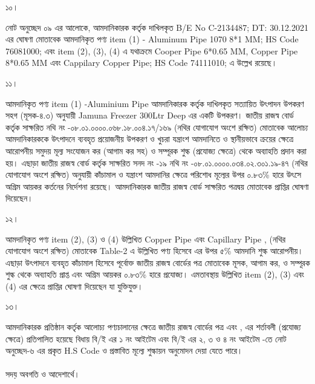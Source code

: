 \documentclass[12pt]{article}
\newcommand{\beno}{C-2134487}
\newcommand{\bedt}{30.12.2021}
\begin{document}
\thispagestyle{empty}
\vspace*{7.0in}
\noindent
\begin{minipage}[t]{0.05\linewidth}
১০।
\end{minipage}
\begin{minipage}[t]{0.95\linewidth}
নোট অনুচ্ছেদ ০৯ এর আলোকে,
আমদানিকারক {\jeal} কর্তৃক
দাখিলকৃত B/E No {\beno}; DT: {\bedt}
এর ঘোষণা মোতাবেক আমদানিকৃত পণ্য
item (1) - Aluminum Pipe 1070 8*1 MM; HS Code 76081000; {\cpcsso} এবং item
(2), (3), (4) এ যথাক্রমে Cooper Pipe 6*0.65 MM, Copper Pipe 8*0.65 MM এবং Cappilary Copper Pipe; HS Code 74111010; {\cpcfzn} এ উল্লেখ রয়েছে।
\\
\end{minipage}
\begin{minipage}[t]{0.05\linewidth}
১১।
\end{minipage}
\begin{minipage}[t]{0.95\linewidth}
আমদানিকৃত পণ্য item (1) -Aluminium Pipe আমদানিকারক কর্তৃক দাখিলকৃত সত্যায়িত উৎপাদন
উপকরণ সহগ (মূসক-৪.৩) অনুযায়ী
Jamuna Freezer 300Ltr Deep এর একটি উপকরণ। জাতীয় রাজস্ব বোর্ড কর্তৃক সাক্ষরিত নথি নং -০৮.০১.০০০০.০৬৮.১৮.০০৪.১৭/১৬৯ (নথির যোগাযোগ অংশে রক্ষিত) মোতাবেক আলোচ্য আমদানিকারককে
উৎপাদনে ব্যবহৃত প্রয়োজনীয় উপকরণ ও খুচরা যন্ত্রাংশ আমদানিতে ও স্থানীয়ভাবে ক্রয়ের ক্ষেত্রে আরোপনীয় সমুদয় মূল্য সংযোজন কর (আগাম কর সহ) ও সম্পূরক শুল্ক (প্রযোজ্য ক্ষেত্রে) থেকে অব্যাহতি প্রদান করা হয়।
এছাড়া
জাতীয় রাজস্ব বোর্ড কর্তৃক সাক্ষরিত সনদ নং -১৯ নথি নং -০৮.০১.০০০০.০৩৪.০২.৩০১.১৯-৪৭ (নথির যোগাযোগ অংশে রক্ষিত)
অনুযায়ী কাঁচামাল ও যন্ত্রাংশ আমদানির ক্ষেত্রে পরিশোধ মূল্যের উপর ০.৮৩\% হারে উৎসে অগ্রিম আয়কর কর্তনের নির্দেশনা রয়েছে।
আমদানিকারক জাতীয় রাজস্ব বোর্ড সাক্ষরিত পত্রদ্বয় মোতাবেক {\cpcsso} প্রাপ্তির ঘোষণা দিয়েছেন।
\\
\end{minipage}
\begin{minipage}[t]{0.05\linewidth}
১২।
\end{minipage}
\begin{minipage}[t]{0.95\linewidth}
আমদানিকৃত পণ্য item (2), (3) ও (4) উল্লিখিত Copper Pipe এবং Capillary Pipe {\srooof}, {\srooofd} (নথির যোগাযোগ অংশে রক্ষিত) মোতাবেক Table-2 এ উল্লিখিত পণ্য হিসেবে এর উপর ৫\% আমদানি শুল্ক আরোপনীয়। এছাড়া উৎপাদনে ব্যবহৃত
কাঁচামাল হিসেবে পূর্বোক্ত জাতীয় রাজস্ব বোর্ডের পত্র মোতাবেক মূসক, আগাম কর, ও সম্পূরক শুল্ক থেকে অব্যাহতি প্রাপ্ত এবং অগ্রিম আয়কর ০.৮৩\% হারে প্রযোজ্য। এমতাবস্থায় উল্লিখিত item (2), (3) এবং (4) এর ক্ষেত্রে {\cpcfzn} প্রাপ্তির ঘোষণা দিয়েছেন যা যুক্তিযুক্ত।
\\
\end{minipage}
\begin{minipage}[t]{0.05\linewidth}
১৩।
\end{minipage}
\begin{minipage}[t]{0.95\linewidth}
আমদানিকারক প্রতিষ্ঠান কর্তৃক
আলোচ্য পণ্যচালানের ক্ষেত্রে
জাতীয় রাজস্ব বোর্ডের পত্র
এবং {\srooof}, {\srooofd}
এর শর্তাবলী (প্রযোজ্য ক্ষেত্রে) প্রতিপালিত হয়েছে
বিধায় 
বি/ই এর ১ নং আইটেম
{\cpcsso}
এবং
বি/ই এর ২, ৩ ও ৪ নং আইটেম
{\cpcfzn} -তে নোট অনুচ্ছেদ-৬ এর প্রকৃত H.S Code
ও প্রস্তাবিত মূল্যে শুল্কায়ন অনুমোদন দেয়া যেতে পারে।
\\
\\
সদয় অবগতি ও আদেশার্থে।
\end{minipage}
\end{document}

